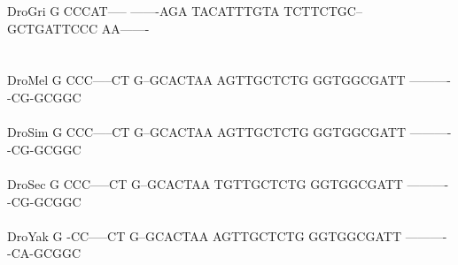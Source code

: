 \documentclass[11pt,twoside,reqno,a4paper]{article}
\begin{document}
{DroGri	G	CCCAT-----	-------AGA	TACATTTGTA	TCTTCTGC--	GCTGATTCCC	AA-------\\
\hspace*{7\charwidth}\hspace*{1\charwidth}\hspace*{1\charwidth}\hspace*{1\charwidth}\hspace*{1\charwidth}\hspace*{1\charwidth}\hspace*{1\charwidth}\\
\\
DroMel	G	CCC-----CT	G--GCACTAA	AGTTGCTCTG	GGTGGCGATT	----------	-CG-GCGGC\\
\hspace*{7\charwidth}\hspace*{1\charwidth}\hspace*{1\charwidth}\hspace*{1\charwidth}\hspace*{1\charwidth}\hspace*{1\charwidth}\hspace*{1\charwidth}\\
DroSim	G	CCC-----CT	G--GCACTAA	AGTTGCTCTG	GGTGGCGATT	----------	-CG-GCGGC\\
\hspace*{7\charwidth}\hspace*{1\charwidth}\hspace*{1\charwidth}\hspace*{1\charwidth}\hspace*{1\charwidth}\hspace*{1\charwidth}\hspace*{1\charwidth}\\
DroSec	G	CCC-----CT	G--GCACTAA	TGTTGCTCTG	GGTGGCGATT	----------	-CG-GCGGC\\
\hspace*{7\charwidth}\hspace*{1\charwidth}\hspace*{1\charwidth}\hspace*{1\charwidth}\hspace*{1\charwidth}\hspace*{1\charwidth}\hspace*{1\charwidth}\\
DroYak	G	-CC-----CT	G--GCACTAA	AGTTGCTCTG	GGTGGCGATT	----------	-CA-GCGGC\\
\hspace*{7\charwidth}\hspace*{1\charwidth}\hspace*{1\charwidth}\hspace*{1\charwidth}\hspace*{1\charwidth}\hspace*{1\charwidth}\hspace*{1\charwidth}\\
}
\end{document}

